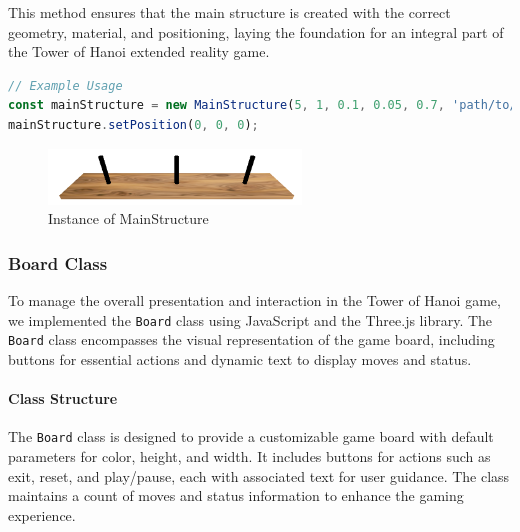 \documentclass{article}
\begin{document}
This method ensures that the main structure is created with the correct geometry, material, and positioning, laying the foundation for an integral part of the Tower of Hanoi extended reality game.


\begin{lstlisting}[language=JavaScript, caption={JS Example for MainStructure}]
// Example Usage
const mainStructure = new MainStructure(5, 1, 0.1, 0.05, 0.7, 'path/to/texture_base.jpg', 'path/to/texture_cylinder.jpg')
mainStructure.setPosition(0, 0, 0);
\end{lstlisting}

\begin{figure}[h]
    \centering
    \includegraphics[width=0.6\textwidth]{img/mainStructure.png}
    \caption{Instance of MainStructure}
    \label{fig:mainStructure}
\end{figure}


\subsubsection{Board Class}
To manage the overall presentation and interaction in the Tower of Hanoi game, we implemented the \texttt{Board} class using JavaScript and the Three.js library. The \texttt{Board} class encompasses the visual representation of the game board, including buttons for essential actions and dynamic text to display moves and status.

\paragraph{Class Structure}
The \texttt{Board} class is designed to provide a customizable game board with default parameters for color, height, and width. It includes buttons for actions such as exit, reset, and play/pause, each with associated text for user guidance. The class maintains a count of moves and status information to enhance the gaming experience.
\end{document}
